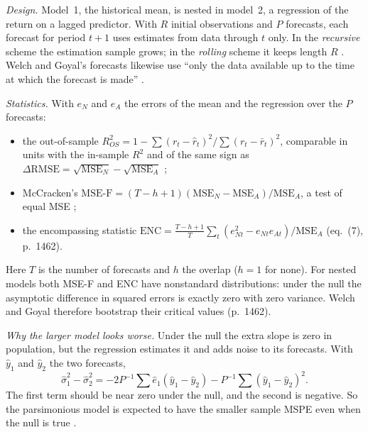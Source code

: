 \begin{qfmethod}\label{meth:nested-forecast-tests}
 \emph{Design.} Model~1, the historical mean, is nested in model~2, a regression of the return on a lagged predictor. With $R$ initial observations and $P$ forecasts, each forecast for period $t+1$ uses estimates from data through $t$ only. In the \emph{recursive} scheme the estimation sample grows; in the \emph{rolling} scheme it keeps length $R$ \citep[NBER Technical WP 326, sec.~3, eq.~(3.6), p.~6, and n.~3]{clark-west-2006-nber}. Welch and Goyal's forecasts likewise use ``only the data available up to the time at which the forecast is made'' \citep[p.~1461]{s7-welch}.

\emph{Statistics.} With $e_N$ and $e_A$ the errors of the mean and the regression over the $P$ forecasts:
\begin{itemize}
\item the out-of-sample $R^2_{OS}=1-\sum(r_t-\hat r_t)^2/\sum(r_t-\bar r_t)^2$, comparable in units with the in-sample $R^2$ and of the same sign as $\Delta\mathrm{RMSE}=\sqrt{\mathrm{MSE}_N}-\sqrt{\mathrm{MSE}_A}$ \citep[NBER WP 11468, eq.~(1), p.~6]{campbell-thompson-2005-nber};
\item McCracken's $\text{MSE-F}=(T-h+1)(\mathrm{MSE}_N-\mathrm{MSE}_A)/\mathrm{MSE}_A$, a test of equal MSE \citep[eq.~(6), p.~1461]{s7-welch};
\item the encompassing statistic $\text{ENC}=\frac{T-h+1}{T}\sum_t(e_{Nt}^2-e_{Nt}e_{At})/\mathrm{MSE}_A$ (eq.~(7), p.~1462).
\end{itemize}
Here $T$ is the number of forecasts and $h$ the overlap ($h=1$ for none). For nested models both MSE-F and ENC have nonstandard distributions: under the null the asymptotic difference in squared errors is exactly zero with zero variance. Welch and Goyal therefore bootstrap their critical values (p.~1462).

\emph{Why the larger model looks worse.} Under the null the extra slope is zero in population, but the regression estimates it and adds noise to its forecasts. With $\hat y_1$ and $\hat y_2$ the two forecasts,
\[ \hat\sigma_1^2-\hat\sigma_2^2=-2P^{-1}\textstyle\sum\hat e_{1}(\hat y_{1}-\hat y_{2})-P^{-1}\sum(\hat y_{1}-\hat y_{2})^2 . \]
The first term should be near zero under the null, and the second is negative. So the parsimonious model is expected to have the smaller sample MSPE even when the null is true \citep[eq.~(3.8), p.~7]{clark-west-2006-nber}.


\end{qfmethod}
